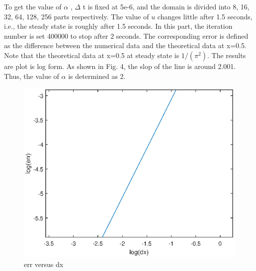 \documentclass[a4paper,10pt]{article}
\begin{document}
To get the value of $\alpha$ , $\Delta$ t is fixed at 5e-6, and the domain is divided into 8, 16, 32, 64, 128, 256 parts respectively. The value of $u$ changes little after 1.5 seconds, i.e., the steady state is roughly after 1.5 seconds. In this part, the iteration number is set 400000 to stop after 2 seconds. The corresponding error is defined as the difference between the numerical data and the theoretical data at x=0.5. Note that the theoretical data at x=0.5 at steady state is $1/(\pi ^2)$. The results are plot is log form. As shown in Fig. 4, the slop of the line is around 2.001. Thus, the value of $\alpha$ is determined as 2.
\begin{figure}[h]
	\centering
	\includegraphics[scale=0.65]{alpha.eps}
	\caption{err versus dx}
\end{figure}
\end{document}
